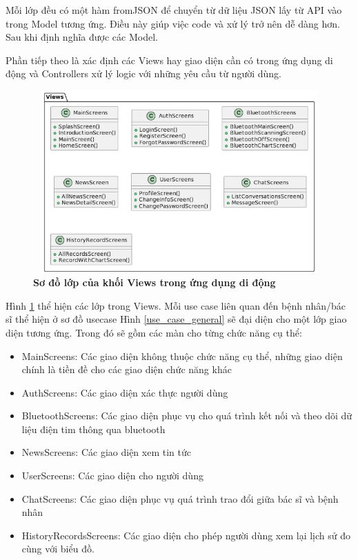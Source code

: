 \begin{enumerate}[a)]
  Mỗi lớp đều có một hàm fromJSON để chuyển từ dữ liệu JSON lấy từ API vào trong Model tương ứng. Điều này giúp
  việc code và xử lý trở nên dễ dàng hơn. Sau khi định nghĩa được các Model.
  
  Phần tiếp theo là xác định các Views hay giao diện cần có trong ứng dụng di động và Controllers xử lý logic với những
  yêu cầu từ người dùng.

  \begin{figure}[H]
    \centering
    \includegraphics[width=14cm,height=7cm]{Images/mobile_app/class_diagram/mobile_class_view.png}
    \caption[Sơ đồ lớp của khối Views trong ứng dụng di động]{\bfseries \fontsize{12pt}{0pt}\selectfont Sơ đồ lớp của khối Views trong ứng dụng di động}
    \label{mobile_class_view} %
  \end{figure}

  Hình \ref{mobile_class_view} thể hiện các lớp trong Views. Mỗi use case liên quan đến bệnh nhân/bác sĩ thể hiện ở sơ đồ 
  usecase Hình \ref{use_case_general} sẽ đại diện cho một lớp giao diện tương ứng. Trong đó sẽ gồm các màn cho từng chức năng
  cụ thể:

  \begin{itemize}
    \item MainScreens: Các giao diện không thuộc chức năng cụ thể, những giao diện chính là tiền đề cho các giao diện chức năng khác
    \item AuthScreens: Các giao diện xác thực người dùng 
    \item BluetoothScreens: Các giao diện phục vụ cho quá trình kết nối và theo dõi dữ liệu điện tim thông qua bluetooth
    \item NewsScreens: Các giao diện xem tin tức
    \item UserScreens: Các giao diện cho người dùng
    \item ChatScreens: Các giao diện phục vụ quá trình trao đổi giữa bác sĩ và bệnh nhân
    \item HistoryRecordsScreens: Các giao diện cho phép người dùng xem lại lịch sử đo cùng với biểu đồ. 
  \end{itemize}
  

\end{enumerate}
